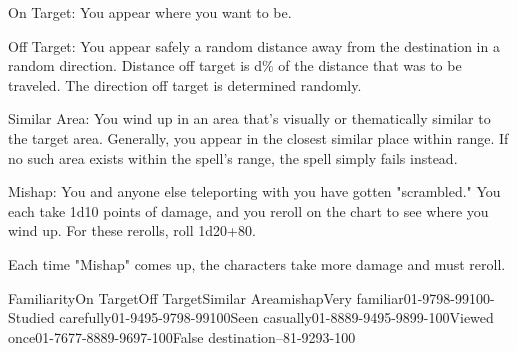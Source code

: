 {On Target: You appear where you want to be.

Off Target: You appear safely a random distance away from the destination in a random direction. Distance off target is d\% of the distance that was to be traveled. The direction off target is determined randomly.

Similar Area: You wind up in an area that's visually or thematically similar to the target area. Generally, you appear in the closest similar place within range. If no such area exists within the spell's range, the spell simply fails instead.

Mishap: You and anyone else teleporting with you have gotten "scrambled." You each take 1d10 points of damage, and you reroll on the chart to see where you wind up. For these rerolls, roll 1d20+80.

Each time "Mishap" comes up, the characters take more damage and must reroll.

 FamiliarityOn TargetOff TargetSimilar AreamishapVery familiar01-9798-99100-Studied carefully01-9495-9798-99100Seen casually01-8889-9495-9899-100Viewed once01-7677-8889-9697-100False destination--81-9293-100 }
        
